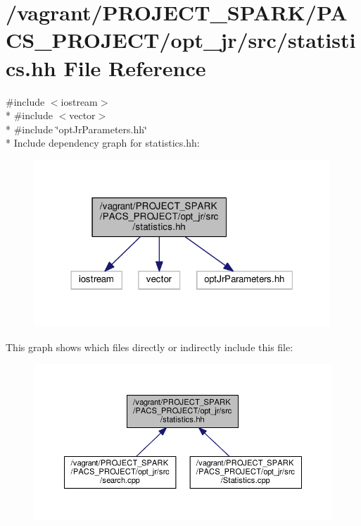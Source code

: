 \hypertarget{statistics_8hh}{\section{/vagrant/\-P\-R\-O\-J\-E\-C\-T\-\_\-\-S\-P\-A\-R\-K/\-P\-A\-C\-S\-\_\-\-P\-R\-O\-J\-E\-C\-T/opt\-\_\-jr/src/statistics.hh File Reference}
\label{statistics_8hh}
}
{\ttfamily \#include $<$iostream$>$}\\*
{\ttfamily \#include $<$vector$>$}\\*
{\ttfamily \#include \char`\"{}opt\-Jr\-Parameters.\-hh\char`\"{}}\\*
Include dependency graph for statistics.\-hh\-:\nopagebreak
\begin{figure}[H]
\begin{center}
\leavevmode
\includegraphics[width=316pt]{statistics_8hh__incl}
\end{center}
\end{figure}
This graph shows which files directly or indirectly include this file\-:\nopagebreak
\begin{figure}[H]
\begin{center}
\leavevmode
\includegraphics[width=350pt]{statistics_8hh__dep__incl}
\end{center}
\end{figure}
